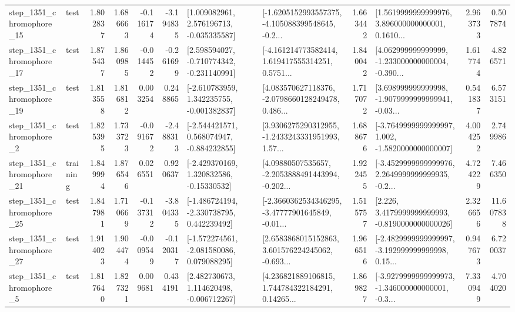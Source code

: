 \begin{tabular}{llrrrrllrlrr}
 step\_1351\_chromophore\_15 &      test &      1.802837 &    1.686663 &     -0.116174 & -3.194835 &    [1.009082961, 2.576196713, -0.035335587] &  [-1.6205152993557375, -4.105088399548645, -0.2... &       1.663442 &  [1.5619999999999976, 3.896000000000001, 0.1610... &            2.963733 &          0.507874 \\
 step\_1351\_chromophore\_17 &      test &      1.875437 &    1.860985 &     -0.014452 & -0.261699 &   [2.598594027, -0.710774342, -0.231140991] &  [-4.161214773582414, 1.619417555314251, 0.5751... &       1.840042 &  [4.062999999999999, -1.233000000000004, -0.390... &            1.617744 &          4.826571 \\
 step\_1351\_chromophore\_19 &      test &      1.813558 &    1.816812 &      0.003254 &  0.248865 &   [-2.610783959, 1.342235755, -0.001382837] &  [4.083570627118376, -2.0798660128249478, 0.486... &       1.717072 &  [3.698999999999998, -1.9079999999999941, -0.03... &            0.541837 &          6.573151 \\
  step\_1351\_chromophore\_2 &      test &      1.825395 &    1.733723 &     -0.091672 & -2.488313 &   [-2.544421571, 0.568074947, -0.884232855] &  [3.9306275290312955, -1.2433243331951993, 1.57... &       1.688676 &  [-3.7649999999999997, 1.002, -1.5820000000000007] &            4.004252 &          2.749986 \\
 step\_1351\_chromophore\_21 &  training &      1.849994 &    1.876546 &      0.026551 &  0.920637 &    [-2.429370169, 1.320832586, -0.15330532] &  [4.09880507535657, -2.2053888491443994, -0.202... &       1.922455 &  [-3.4529999999999976, 2.2649999999999935, -0.2... &            4.724229 &          7.466350 \\
 step\_1351\_chromophore\_25 &      test &      1.847981 &    1.710669 &     -0.137312 & -3.804335 &   [-1.486724194, -2.330738795, 0.442239492] &  [-2.3660362534346295, -3.47777901645849, -0.01... &       1.515757 &   [2.226, 3.4179999999999993, -0.8190000000000026] &            2.326656 &         11.607838 \\
 step\_1351\_chromophore\_27 &      test &      1.914023 &    1.904474 &     -0.009549 & -0.120317 &   [-1.572274561, -2.081580086, 0.079088295] &  [2.6583868015152863, 3.601576224245062, -0.693... &       1.966516 &  [-2.4829999999999997, -3.192999999999998, 0.15... &            0.947673 &          6.720037 \\
  step\_1351\_chromophore\_5 &      test &      1.817640 &    1.827321 &      0.009681 &  0.434191 &    [2.482730673, 1.114620498, -0.006712267] &  [4.236821889106815, 1.744784322184291, 0.14265... &       1.869827 &  [-3.9279999999999973, -1.346000000000001, -0.3... &            7.330949 &          4.704020 \\

\end{tabular}
